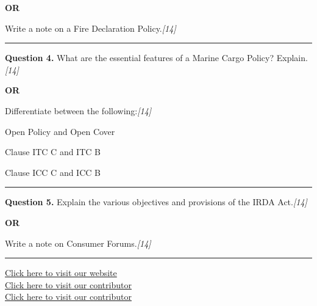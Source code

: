 \documentclass[11pt,a4paper]{article}
\newcommand{\pts}[1]{\hfill   \textit{[#1]}}
\begin{document}
\centerline{   \textbf{OR}}

Write a note on a Fire Declaration Policy.\pts{14}

\medskip\rule{\linewidth}{0.2pt}




\noindent   \textbf{Question 4.}
What are the essential features of a Marine Cargo Policy? Explain.\pts{14}

\centerline{   \textbf{OR}}

Differentiate between the following:\pts{14}

\begin{parts}
  \item Open Policy and Open Cover
  \item Clause ITC C and ITC B
  \item Clause ICC C and ICC B
\end{parts}

\medskip\rule{\linewidth}{0.2pt}




\noindent   \textbf{Question 5.}
Explain the various objectives and provisions of the IRDA Act.\pts{14}

\centerline{   \textbf{OR}}

Write a note on Consumer Forums.\pts{14}

\vfill
\rule{\linewidth}{0.4pt}

\begin{center}\small
\href{https://bhu-exam.vercel.app/}{Click here to visit our website}\\[4pt]
\href{https://me-aryan.vercel.app/}{Click here to visit our contributor}\\[4pt]
\href{https://quashan-me.vercel.app/}{Click here to visit our contributor}
\end{center}
\end{document}
